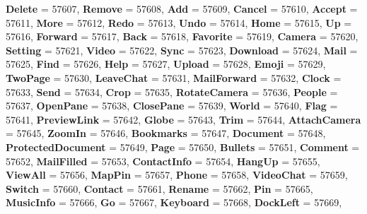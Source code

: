 \begin{DoxyCompactItemize}
{\bfseries Delete} = 57607, 
\newline
{\bfseries Remove} = 57608, 
{\bfseries Add} = 57609, 
{\bfseries Cancel} = 57610, 
{\bfseries Accept} = 57611, 
\newline
{\bfseries More} = 57612, 
{\bfseries Redo} = 57613, 
{\bfseries Undo} = 57614, 
{\bfseries Home} = 57615, 
\newline
{\bfseries Up} = 57616, 
{\bfseries Forward} = 57617, 
{\bfseries Back} = 57618, 
{\bfseries Favorite} = 57619, 
\newline
{\bfseries Camera} = 57620, 
{\bfseries Setting} = 57621, 
{\bfseries Video} = 57622, 
{\bfseries Sync} = 57623, 
\newline
{\bfseries Download} = 57624, 
{\bfseries Mail} = 57625, 
{\bfseries Find} = 57626, 
{\bfseries Help} = 57627, 
\newline
{\bfseries Upload} = 57628, 
{\bfseries Emoji} = 57629, 
{\bfseries Two\+Page} = 57630, 
{\bfseries Leave\+Chat} = 57631, 
\newline
{\bfseries Mail\+Forward} = 57632, 
{\bfseries Clock} = 57633, 
{\bfseries Send} = 57634, 
{\bfseries Crop} = 57635, 
\newline
{\bfseries Rotate\+Camera} = 57636, 
{\bfseries People} = 57637, 
{\bfseries Open\+Pane} = 57638, 
{\bfseries Close\+Pane} = 57639, 
\newline
{\bfseries World} = 57640, 
{\bfseries Flag} = 57641, 
{\bfseries Preview\+Link} = 57642, 
{\bfseries Globe} = 57643, 
\newline
{\bfseries Trim} = 57644, 
{\bfseries Attach\+Camera} = 57645, 
{\bfseries Zoom\+In} = 57646, 
{\bfseries Bookmarks} = 57647, 
\newline
{\bfseries Document} = 57648, 
{\bfseries Protected\+Document} = 57649, 
{\bfseries Page} = 57650, 
{\bfseries Bullets} = 57651, 
\newline
{\bfseries Comment} = 57652, 
{\bfseries Mail\+Filled} = 57653, 
{\bfseries Contact\+Info} = 57654, 
{\bfseries Hang\+Up} = 57655, 
\newline
{\bfseries View\+All} = 57656, 
{\bfseries Map\+Pin} = 57657, 
{\bfseries Phone} = 57658, 
{\bfseries Video\+Chat} = 57659, 
\newline
{\bfseries Switch} = 57660, 
{\bfseries Contact} = 57661, 
{\bfseries Rename} = 57662, 
{\bfseries Pin} = 57665, 
\newline
{\bfseries Music\+Info} = 57666, 
{\bfseries Go} = 57667, 
{\bfseries Keyboard} = 57668, 
{\bfseries Dock\+Left} = 57669, 
\newline

\end{DoxyCompactItemize}
